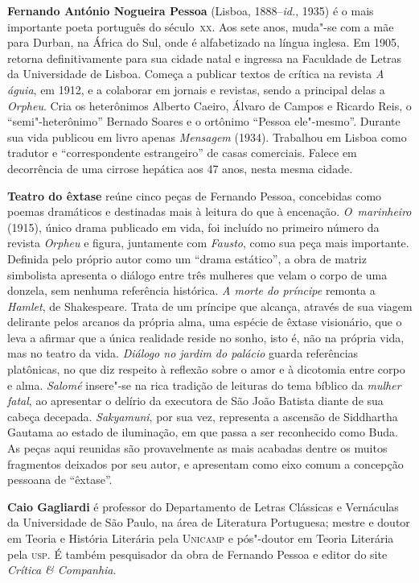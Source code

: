\textbf{Fernando António Nogueira Pessoa} (Lisboa, 1888--\textit{id.}, 1935) é o mais
importante poeta português do século~\textsc{xx}. Aos sete anos, muda"-se com a mãe para Durban,
na África do Sul, onde é alfabetizado na língua inglesa.
Em 1905, retorna definitivamente para sua cidade natal e ingressa na Faculdade de Letras
da Universidade de Lisboa. Começa a publicar textos de crítica na revista
\textit{A águia}, em 1912, e a colaborar em jornais e revistas, sendo a principal delas a 
\textit{Orpheu}. Cria os heterônimos Alberto Caeiro, Álvaro
de Campos e Ricardo Reis, o ``semi"-heterônimo'' Bernado Soares e o ortônimo
``Pessoa ele"-mesmo''. Durante sua vida publicou em livro apenas \textit{Mensagem} (1934). 
Trabalhou em Lisboa como tradutor e ``correspondente estrangeiro'' de casas comerciais. 
Falece em decorrência de uma cirrose hepática aos 47 anos, nesta mesma cidade. 

\textbf{Teatro do êxtase} reúne cinco peças de Fernando Pessoa, concebidas 
como poemas dramáticos e destinadas mais à leitura do que à encenação. 
\textit{O~marinheiro} (1915), único drama publicado em vida, foi incluído no
primeiro número da revista \textit{Orpheu} e figura, juntamente com
\textit{Fausto}, como sua peça mais importante.  Definida pelo próprio autor
como um ``drama estático'', a obra de matriz simbolista apresenta o diálogo
entre três mulheres que velam o corpo de uma donzela, sem nenhuma referência
histórica. 
%
\textit{A morte do príncipe} remonta a \textit{Hamlet}, de Shakespeare. 
Trata de um príncipe que
alcança, através de sua viagem delirante pelos arcanos da própria alma,
uma espécie de êxtase visionário, que o leva a afirmar que a única
realidade reside no sonho, isto é, não na própria vida, mas no teatro
da vida. 
%
\textit{Diálogo no jardim do palácio} guarda referências platônicas,
no que diz respeito à reflexão sobre o amor e à dicotomia
entre corpo e alma.
%
\textit{Salomé} insere"-se na rica tradição de leituras do
tema bíblico da \textit{mulher fatal}, ao apresentar o delírio 
da executora de São João Batista diante de sua cabeça decepada. 
%
\textit{Sakyamuni}, por sua vez, representa a ascensão de Siddhartha Gautama ao estado de
iluminação, em que passa a ser reconhecido como Buda. 
%
As peças aqui reunidas são provavelmente as mais acabadas
dentre os muitos fragmentos deixados por seu autor, e apresentam
como eixo comum a concepção pessoana de ``êxtase''.


\textbf{Caio Gagliardi} é professor do Departamento de Letras Clássicas e
Vernáculas da Universidade de São Paulo, na área de Literatura
Portuguesa; mestre e doutor em Teoria e História Literária pela \textsc{Unicamp}
e pós"-doutor em Teoria Literária pela \textsc{usp}. É também pesquisador da obra
de Fernando Pessoa e editor do site \textit{Crítica \& Companhia}.




